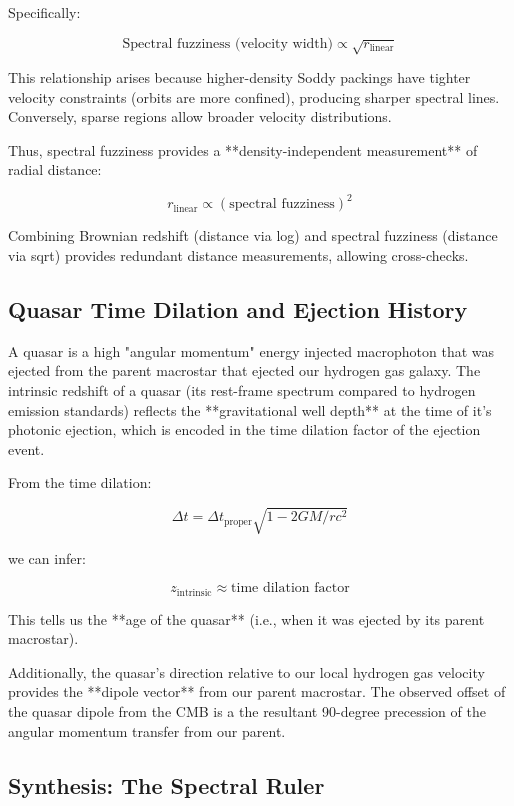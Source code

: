 \documentclass[11pt,a4paper]{article}
\begin{document}
    Specifically:
    
    \[
    \text{Spectral fuzziness (velocity width)} \propto \sqrt{r_{\text{linear}}    }
    \]
    
    This relationship arises because higher-density Soddy packings have tighter velocity constraints (orbits are more confined), producing    sharper spectral lines. Conversely, sparse regions allow broader velocity distributions.
    
    Thus, spectral fuzziness provides a **density-independent measurement** of radial distance:

    \[
    \boxed{r_{\text{linear}} \propto (\text{spectral fuzziness})^2}
    \]

    Combining Brownian redshift (distance via log) and spectral fuzziness (distance via sqrt) provides redundant distance measurements, allowing cross-checks.

  \subsection{Quasar Time Dilation and Ejection History}

    A quasar is a high "angular momentum" energy injected macrophoton that was ejected from the parent macrostar that ejected our hydrogen gas galaxy. The intrinsic redshift of a quasar (its rest-frame spectrum compared to hydrogen emission standards) reflects the **gravitational well depth** at the time of it's photonic ejection, which is encoded in the time dilation factor of the ejection event.

    From the time dilation:

    \[
    \Delta t = \Delta t_{\text{proper}} \sqrt{1 - 2GM/rc^2}
    \]

    we can infer:

    \[
    z_{\text{intrinsic}} \approx \text{time dilation factor}
    \]

    This tells us the **age of the quasar** (i.e., when it was ejected by its parent macrostar).

    Additionally, the quasar's direction relative to our local hydrogen gas velocity provides the **dipole vector** from our parent macrostar. The observed offset of the quasar dipole from the CMB is a the resultant 90-degree precession of the angular momentum transfer from our parent.

  \subsection{Synthesis: The Spectral Ruler}
\end{document}
